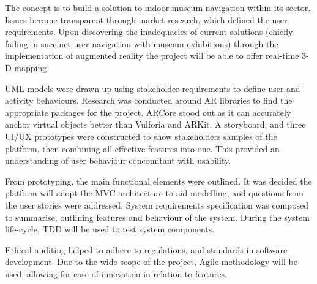 
The concept is to build a solution to indoor museum navigation within its sector. Issues became transparent through market research, which defined the user requirements. Upon discovering the inadequacies of current solutions (chiefly failing in succinct user navigation with museum exhibitions) through the implementation of augmented reality the project will be able to offer real-time 3-D mapping.

UML models were drawn up using stakeholder requirements to define user and activity behaviours. Research was conducted around AR libraries to find the appropriate packages for the project. ARCore stood out as it can accurately anchor virtual objects better than Vulforia and ARKit. A storyboard, and three UI/UX prototypes were constructed to show stakeholders samples of the platform, then combining all effective features into one. This provided an understanding of user behaviour concomitant with usability.

From prototyping, the main functional elements were outlined. It was decided the platform will adopt the MVC architecture to aid modelling, and questions from the user stories were addressed. System requirements specification was composed to summarise, outlining features and behaviour of the system. During the system life-cycle, TDD will be used to test system components.

Ethical auditing helped to adhere to regulations, and standards in software development. Due to the wide scope of the project, Agile methodology will be used, allowing for ease of innovation in relation to features.
